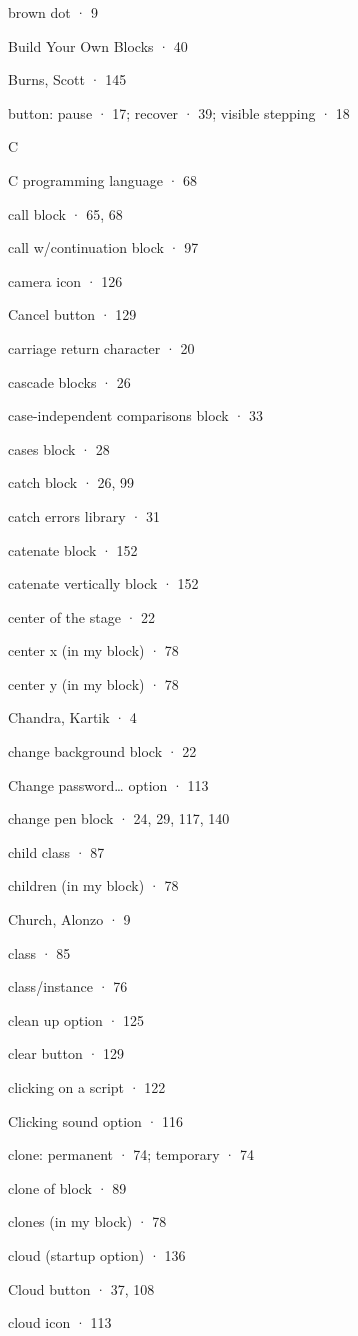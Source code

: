\documentclass[
  letterpaper,
]{book}
\begin{document}
brown dot · 9

Build Your Own Blocks · 40

Burns, Scott · 145

button: pause · 17; recover · 39; visible stepping · 18

C

C programming language · 68

call block · 65, 68

call w/continuation block · 97

camera icon · 126

Cancel button · 129

carriage return character · 20

cascade blocks · 26

case-independent comparisons block · 33

cases block · 28

catch block · 26, 99

catch errors library · 31

catenate block · 152

catenate vertically block · 152

center of the stage · 22

center x (in my block) · 78

center y (in my block) · 78

Chandra, Kartik · 4

change background block · 22

Change password\ldots{} option · 113

change pen block · 24, 29, 117, 140

child class · 87

children (in my block) · 78

Church, Alonzo · 9

class · 85

class/instance · 76

clean up option · 125

clear button · 129

clicking on a script · 122

Clicking sound option · 116

clone: permanent · 74; temporary · 74

clone of block · 89

clones (in my block) · 78

cloud (startup option) · 136

Cloud button · 37, 108

cloud icon · 113
\end{document}
